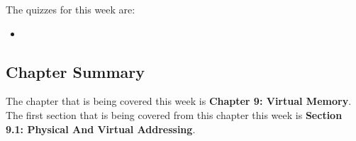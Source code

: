 The quizzes for this week are:

\begin{itemize}
    \item {}
\end{itemize}

\newpage

\subsection{Chapter Summary}

The chapter that is being covered this week is \textbf{Chapter 9: Virtual Memory}. The first section that is being covered from this chapter this week is \textbf{Section 9.1: Physical And Virtual Addressing}.

